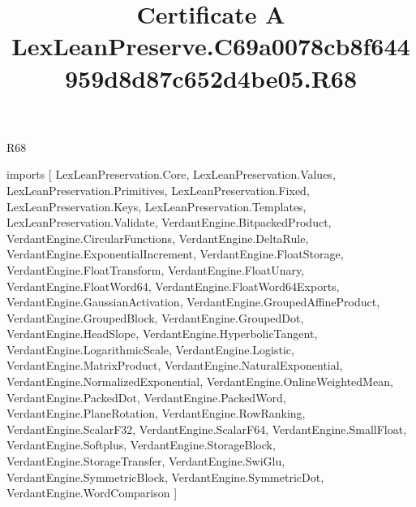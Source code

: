 \begin{lexlean}{R68}
\title{Certificate A LexLeanPreserve.C69a0078cb8f644959d8d87c652d4be05.R68}
\begin{coremodule}
imports [
  LexLeanPreservation.Core,
  LexLeanPreservation.Values,
  LexLeanPreservation.Primitives,
  LexLeanPreservation.Fixed,
  LexLeanPreservation.Keys,
  LexLeanPreservation.Templates,
  LexLeanPreservation.Validate,
  VerdantEngine.BitpackedProduct,
  VerdantEngine.CircularFunctions,
  VerdantEngine.DeltaRule,
  VerdantEngine.ExponentialIncrement,
  VerdantEngine.FloatStorage,
  VerdantEngine.FloatTransform,
  VerdantEngine.FloatUnary,
  VerdantEngine.FloatWord64,
  VerdantEngine.FloatWord64Exports,
  VerdantEngine.GaussianActivation,
  VerdantEngine.GroupedAffineProduct,
  VerdantEngine.GroupedBlock,
  VerdantEngine.GroupedDot,
  VerdantEngine.HeadSlope,
  VerdantEngine.HyperbolicTangent,
  VerdantEngine.LogarithmicScale,
  VerdantEngine.Logistic,
  VerdantEngine.MatrixProduct,
  VerdantEngine.NaturalExponential,
  VerdantEngine.NormalizedExponential,
  VerdantEngine.OnlineWeightedMean,
  VerdantEngine.PackedDot,
  VerdantEngine.PackedWord,
  VerdantEngine.PlaneRotation,
  VerdantEngine.RowRanking,
  VerdantEngine.ScalarF32,
  VerdantEngine.ScalarF64,
  VerdantEngine.SmallFloat,
  VerdantEngine.Softplus,
  VerdantEngine.StorageBlock,
  VerdantEngine.StorageTransfer,
  VerdantEngine.SwiGlu,
  VerdantEngine.SymmetricBlock,
  VerdantEngine.SymmetricDot,
  VerdantEngine.WordComparison
]


\end{coremodule}
\end{lexlean}
